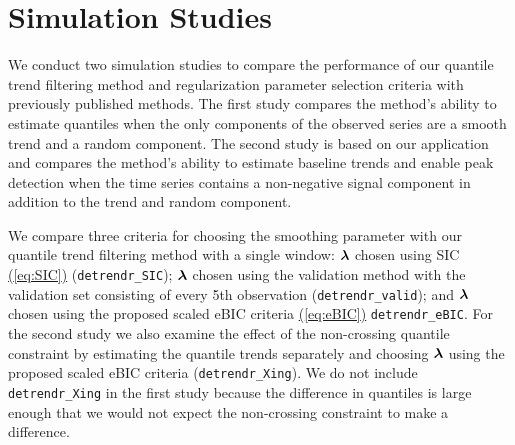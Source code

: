 \documentclass[aoas]{imsart}
\newcommand{\Eqn}[1]{\hyperref[eq:#1]{{\rm (\ref*{eq:#1})}}} %
\newcommand{\Eqn}[1]{{(\ref{eq:#1})}} %
\newcommand{\V}[1]{{\bm{\mathbf{\MakeLowercase{#1}}}}} %
\newcommand{\M}[1]{{\bm{\mathbf{\MakeUppercase{#1}}}}} %
\begin{document}

\section{Simulation Studies}
\label{sec:simluation}

We conduct two simulation studies to compare the performance of our quantile trend filtering method and regularization parameter selection criteria with previously published methods. The first study compares the method's ability to estimate quantiles when the only components of the observed series are a smooth trend and a random component. The second study is based on our application and compares the method's ability to estimate baseline trends and enable peak detection when the time series contains a non-negative signal component in addition to the trend and random component.

We compare three criteria for choosing the smoothing parameter with our quantile trend filtering method with a single window:  $\V{\lambda}$ chosen using SIC \Eqn{SIC} \citep{KoenkerNgPortnoy1994} (\texttt{detrendr\_SIC}); $\V{\lambda}$ chosen using the validation method with the validation set consisting of every 5th observation (\texttt{detrendr\_valid}); and $\V{\lambda}$ chosen using the proposed scaled eBIC criteria \Eqn{eBIC} \texttt{detrendr\_eBIC}. For the second study we also examine the effect of the non-crossing quantile constraint by estimating the quantile trends separately and choosing $\V{\lambda}$ using the proposed scaled eBIC criteria (\texttt{detrendr\_Xing}). We do not include \texttt{detrendr\_Xing} in the first study because the difference in quantiles is large enough that we would not expect the non-crossing constraint to make a difference. 
\end{document}
